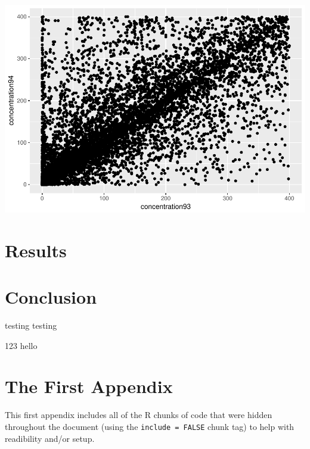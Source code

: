 \documentclass[12pt,twoside]{dukestatscithesis}
\theoremstyle{definition}
\theoremstyle{definition}
\theoremstyle{definition}
\theoremstyle{remark}
\begin{document}
\includegraphics{thesis_files/figure-latex/unnamed-chunk-6-1.pdf}

\chapter{Results}\label{organization}

\chapter*{Conclusion}\label{conclusion}

testing testing

123 hello

\appendix

\chapter{The First Appendix}\label{the-first-appendix}

This first appendix includes all of the R chunks of code that were
hidden throughout the document (using the \texttt{include\ =\ FALSE}
chunk tag) to help with readibility and/or setup.
\end{document}
